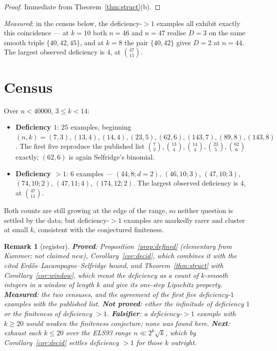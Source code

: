 \documentclass[11pt]{article}
\newtheorem{remark}[theorem]{Remark}
\begin{document}
\begin{proof}
Immediate from Theorem~\ref{thm:struct}(b).
\end{proof}

\emph{Measured}: in the census below, the deficiency-$>1$ examples all exhibit exactly this
coincidence --- at $k=10$ both $n=46$ and $n=47$ realise $D=3$ on the same smooth triple
$\{40,42,45\}$, and at $k=8$ the pair $\{40,42\}$ gives $D=2$ at $n=44$.  The largest
observed deficiency is $4$, at $\binom{47}{11}$.

\section{Census}
Over $n<40000$, $3\le k<14$:
\begin{itemize}
\item \textbf{Deficiency $1$}: $25$ examples, beginning
      $(n,k)=(7,3),(13,4),(14,4),(23,5),(62,6),(143,7),(89,8),(143,8)$.  The first five
      reproduce the published list $\binom73,\binom{13}4,\binom{14}4,\binom{23}5,\binom{62}6$
      exactly; $(62,6)$ is again Selfridge's binomial.
\item \textbf{Deficiency $>1$}: $6$ examples ---
      $(44,8;d{=}2)$, $(46,10;3)$, $(47,10;3)$, $(74,10;2)$, $(47,11;4)$, $(174,12;2)$.
      The largest observed deficiency is $4$, at $\binom{47}{11}$.
\end{itemize}
Both counts are still growing at the edge of the range, so neither question is settled by the
data; but deficiency-$>1$ examples are markedly rarer and cluster at small $k$, consistent
with the conjectured finiteness.

\begin{remark}[register]
\textbf{Proved}: Proposition~\ref{prop:defined} (elementary from Kummer; not claimed new),
Corollary~\ref{cor:decid}, which combines it with the cited Erd\H{o}s--Lacampagne--Selfridge
bound, and Theorem~\ref{thm:struct} with Corollary~\ref{cor:window}, which recast the
deficiency as a count of $k$-smooth integers in a window of length $k$ and give its
one-step Lipschitz property.  \textbf{Measured}: the two censuses, and the agreement of the first five
deficiency-$1$ examples with the published list.  \textbf{Not proved}: either the infinitude
of deficiency $1$ or the finiteness of deficiency $>1$.  \textbf{Falsifier}: a
deficiency-$>1$ example with $k\ge20$ would weaken the finiteness conjecture; none was found
here.  \textbf{Next}: exhaust each $k\le20$ over the ELS93 range $n\ll2^{k}\sqrt k$, which by
Corollary~\ref{cor:decid} settles deficiency $>1$ for those $k$ outright.
\end{remark}
\end{document}

